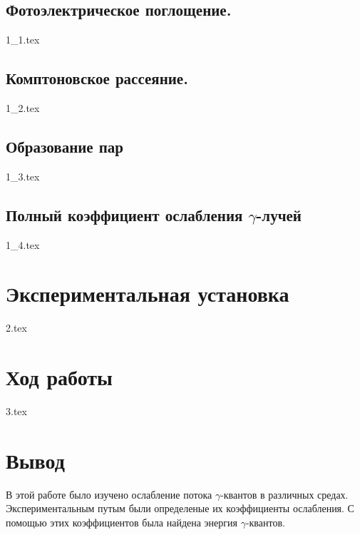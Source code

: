 \documentclass[a5paper, 10pt, twoside]{article} %
\begin{document}
  \subsection{Фотоэлектрическое поглощение.}
  {1_1.tex}

  \subsection{Комптоновское рассеяние.}
  {1_2.tex}

  \subsection{Образование пар}
  {1_3.tex}

  \subsection{Полный коэффициент ослабления $\gamma$-лучей}
  {1_4.tex}

\section{Экспериментальная установка}
{2.tex}

\section{Ход работы}
{3.tex}

\section{Вывод}
В этой работе было изучено ослабление потока $\gamma$-квантов в различных
средах. Экспериментальным путым были определеные их коэффициенты ослабления. С
помощью этих коэффициентов была найдена энергия $\gamma$-квантов.
\end{document}
